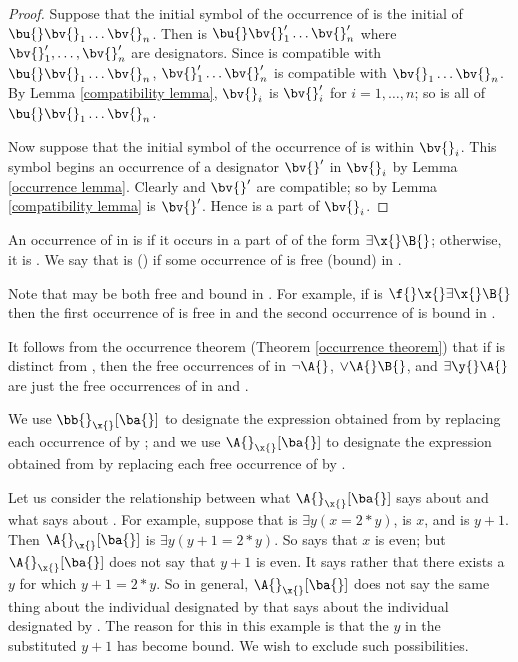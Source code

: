 \begin{proof}
    Suppose that the initial symbol of the occurrence of \bv{} is the initial \bu{} of $\bu{} \bv{}_1 \dots \bv{}_n$.
    Then \bv{} is $\bu{} \bv{}_1' \dots \bv{}_n'$ where $\bv{}_1', \dots, \bv{}_n'$ are designators.
    Since \bv{} is compatible with $\bu{} \bv{}_1 \dots \bv{}_n$, $\bv{}_1' \dots \bv{}_n'$ is compatible with $\bv{}_1 \dots \bv{}_n$.
    By Lemma \eqref{compatibility lemma}, $\bv{}_i$ is $\bv{}_i'$ for $i = 1, \dots, n$;
    so \bv{} is all of $\bu{} \bv{}_1 \dots \bv{}_n$.
    
    Now suppose that the initial symbol of the occurrence of \bv{} is within $\bv{}_i$.
    This symbol begins an occurrence of a designator $\bv{}'$ in $\bv{}_i$ by Lemma \eqref{occurrence lemma}.
    Clearly \bv{} and $\bv{}'$ are compatible;
    so by Lemma \eqref{compatibility lemma} \bv{} is $\bv{}'$.
    Hence \bv{} is a part of $\bv{}_i$.
\end{proof}

An occurrence of \x{} in \A{} is  \A{} if it occurs in a part of \A{} of the form $\exists \x{} \B{}$;
otherwise, it is  \A{}.
We say that \x{} is  ()  \A{} if some occurrence of \x{} is free (bound) in \A{}.

\begin{remark}
    Note that \x{} may be both free and bound in \A{}.
    For example, if \A{} is $\f{} \x{} \exists \x{} \B{}$ then the first occurrence of \x{} is free in \A{} and the second occurrence of \x{} is bound in \A{}.
\end{remark}

It follows from the occurrence theorem (Theorem \eqref{occurrence theorem}) that if \y{} is distinct from \x{}, then the free occurrences of \x{} in $\neg \A{}$, $\vee \A{} \B{}$, and $\exists \y{} \A{}$ are just the free occurrences of \x{} in \A{} and \B{}.

We use $\bb{}_\x{} [\ba{}]$ to designate the expression obtained from \bb{} by replacing each occurrence of \x{} by \ba{};
and we use $\A{}_\x{} [\ba{}]$ to designate the expression obtained from \A{} by replacing each free occurrence of \x{} by \ba{}.


Let us consider the relationship between what $\A{}_\x{} [\ba{}]$ says about \ba{} and what \A{} says about \x{}.
For example, suppose that \A{} is $\exists y (x = 2 * y)$, \x{} is $x$, and \ba{} is $y + 1$.
Then $\A{}_\x{} [\ba{}]$ is $\exists y (y + 1 = 2 * y)$.
So \A{} says that $x$ is even;
but $\A{}_\x{} [\ba{}]$ does not say that $y + 1$ is even.
It says rather that there exists a $y$ for which $y + 1 = 2 * y$.
So in general, $\A{}_\x{} [\ba{}]$ does not say the same thing about the individual designated by \ba{} that \A{} says about the individual designated by \x{}.
The reason for this in this example is that the $y$ in the substituted $y + 1$ has become bound.
We wish to exclude such possibilities.

